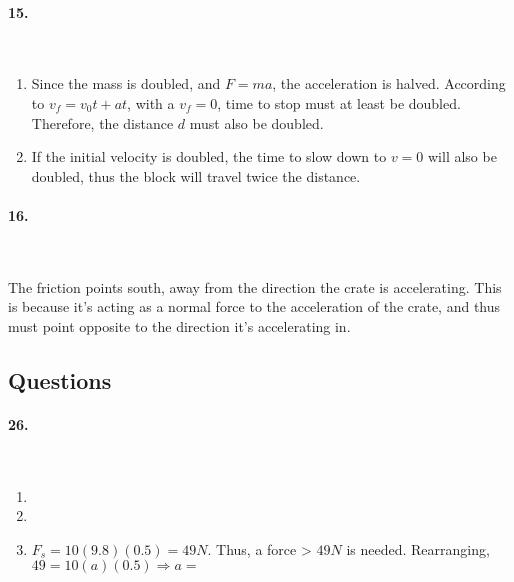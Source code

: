     \paragraph*{15.}\mbox{}
    \\
    \begin{mdframed}
        \begin{enumerate}[label=\alph*.]
            \item Since the mass is doubled, and $F=ma$, the acceleration is halved. According to $v_{f} = v_{0}t + at$, with a $v_{f} = 0$, time to stop must at least be doubled. Therefore, the distance $d$ must also be doubled.
            
            \item If the initial velocity is doubled, the time to slow down to $v = 0$ will also be doubled, thus the block will travel twice the distance.
        \end{enumerate}
    \end{mdframed}

    \paragraph*{16.}\mbox{}
    \\
    \begin{mdframed}
        The friction points south, away from the direction the crate is accelerating. This is because it's acting as a normal force to the acceleration of the crate, and thus must point opposite to the direction it's accelerating in.
    \end{mdframed}

    \subsection*{Questions}
    
    \paragraph*{26.}\mbox{}
    \\
    \begin{mdframed}
        \begin{enumerate}[label=\alph*.]
            \item 
            \item 
            \item $F_{s} = 10(9.8)(0.5) = 49 N$. Thus, a force > $49 N$ is needed. Rearranging, $49 = 10(a)(0.5) \Rightarrow a = $
        \end{enumerate}
    \end{mdframed}
